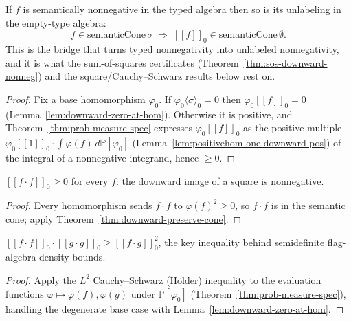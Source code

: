 \begin{theorem}
  \label{thm:downward-preserve-cone}
  \leanok
  If $f$ is semantically nonnegative in the typed algebra then so is its
  unlabeling in the empty-type algebra:
  \[ f \in \mathrm{semanticCone}\,\sigma \;\Longrightarrow\;
     [\![f]\!]_0 \in \mathrm{semanticCone}\,\emptyset. \]
  This is the bridge that turns typed nonnegativity into unlabeled
  nonnegativity, and it is what the sum-of-squares certificates
  (Theorem~\ref{thm:sos-downward-nonneg}) and the square/Cauchy--Schwarz results
  below rest on.
\end{theorem}
\begin{proof}\leanok
  Fix a base homomorphism $\varphi_0$. If $\varphi_0\langle\sigma\rangle_0 = 0$
  then $\varphi_0[\![f]\!]_0 = 0$ (Lemma~\ref{lem:downward-zero-at-hom}).
  Otherwise it is positive, and Theorem~\ref{thm:prob-measure-spec} expresses
  $\varphi_0[\![f]\!]_0$ as the positive multiple
  $\varphi_0[\![1]\!]_0 \cdot \int \varphi(f)\, d\mathbb{P}[\varphi_0]$
  (Lemma~\ref{lem:positivehom-one-downward-pos}) of the integral of a nonnegative
  integrand, hence $\ge 0$.
\end{proof}

\begin{theorem}
  \label{thm:square-downward-nonneg}
  \leanok
  $[\![f\cdot f]\!]_0 \ge 0$ for every $f$: the downward image of a square is
  nonnegative.
\end{theorem}
\begin{proof}\leanok
  Every homomorphism sends $f\cdot f$ to $\varphi(f)^2 \ge 0$, so $f\cdot f$ is in
  the semantic cone; apply Theorem~\ref{thm:downward-preserve-cone}.
\end{proof}

\begin{theorem}
  \label{thm:cauchy-schwarz}
  \leanok
  $[\![f\cdot f]\!]_0 \cdot [\![g\cdot g]\!]_0 \ge [\![f\cdot g]\!]_0^2$, the key
  inequality behind semidefinite flag-algebra density bounds.
\end{theorem}
\begin{proof}\leanok
  Apply the $L^2$ Cauchy--Schwarz (Hölder) inequality to the evaluation functions
  $\varphi \mapsto \varphi(f), \varphi(g)$ under $\mathbb{P}[\varphi_0]$
  (Theorem~\ref{thm:prob-measure-spec}), handling the degenerate base case with
  Lemma~\ref{lem:downward-zero-at-hom}.
\end{proof}

